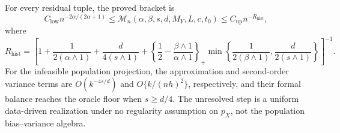 For every residual tuple, the proved bracket is
\[
C_{\mathrm{low}}n^{-2\alpha/(2\alpha+1)}
\le \mathcal M_n(\alpha,\beta,s,d,M_Y,L,c,t_0)
\le C_{\mathrm{up}}n^{-R_{\mathrm{hist}}},
\]
where
\[
R_{\mathrm{hist}}=
\left[1+\frac1{2(\alpha\wedge1)}+\frac d{4(s\wedge1)}+
\left\{\frac12-\frac{\beta\wedge1}{\alpha\wedge1}\right\}_+
\min\left\{\frac1{2(\beta\wedge1)},\frac d{2(s\wedge1)}\right\}\right]^{-1}.
\]
For the infeasible population projection, the approximation and second-order variance terms are \(O(k^{-4s/d})\) and \(O\{k/(nh)^2\}\), respectively, and their formal balance reaches the oracle floor when \(s\ge d/4\). The unresolved step is a uniform data-driven realization under no regularity assumption on \(p_X\), not the population bias--variance algebra.